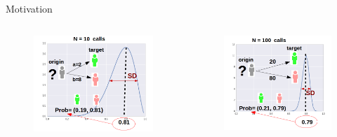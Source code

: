 \documentclass[usenames,dvipsnames]{beamer}
\begin{document}
\begin{frame}{Motivation}

\begin{columns}
\begin{column}{0.49\textwidth}

\begin{figure}[h]
\begin{center}
\includegraphics[width=\columnwidth]{distribucion1.png}
\end{center}
\end{figure}
\end{column}

\begin{column}{0.49\textwidth}

\begin{figure}[h]
\begin{center}
\includegraphics[width=\columnwidth]{distribucion2.png}
\end{center}
\end{figure}


\end{column}
\end{columns}
\end{frame}
\end{document}
